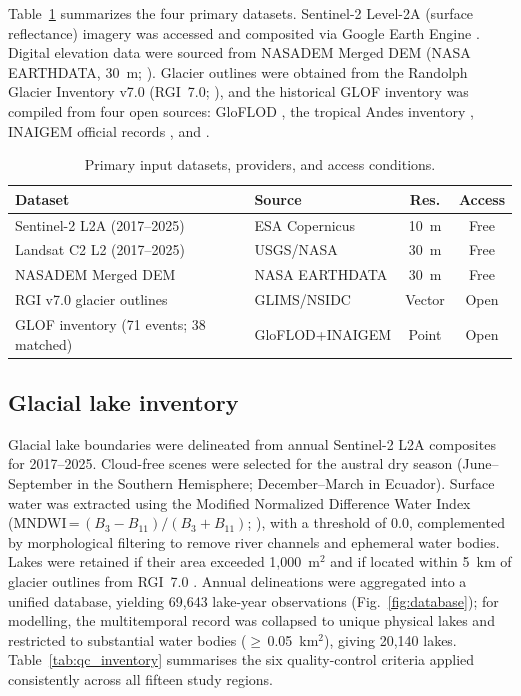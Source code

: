 \documentclass[pdflatex,sn-basic]{sn-jnl}%
\begin{document}
Table~\ref{tab:data_sources} summarizes the four primary datasets.
Sentinel-2 Level-2A (surface reflectance) imagery was accessed and
composited via Google Earth Engine \citep{Gorelick2017}. Digital elevation data were sourced
from NASADEM Merged DEM (NASA EARTHDATA, 30~m; \citep{NASADEM2020}).
Glacier outlines were obtained from the Randolph Glacier Inventory
v7.0 (RGI~7.0; \citep{RGI2023}), and the historical GLOF inventory
was compiled from four open sources: GloFLOD \citep{Lutzow2023}, the
tropical Andes inventory \citep{Emmer2022}, INAIGEM official records
\citep{INAIGEM2018}, and \citet{IribarrenAnacona2015}.

\begin{table}[!t]
\caption{Primary input datasets, providers, and access conditions.}
\label{tab:data_sources}
\centering
\begin{tabular*}{\textwidth}{@{\extracolsep{\fill}}llcc}
\toprule
\textbf{Dataset} & \textbf{Source} & \textbf{Res.} & \textbf{Access} \\
\midrule
Sentinel-2 L2A (2017--2025) & ESA Copernicus  & 10~m   & Free \\
Landsat C2 L2 (2017--2025)   & USGS/NASA       & 30~m   & Free \\
NASADEM Merged DEM           & NASA EARTHDATA  & 30~m   & Free \\
RGI v7.0 glacier outlines    & GLIMS/NSIDC     & Vector & Open \\
GLOF inventory (71 events; 38 matched) & GloFLOD+INAIGEM & Point & Open \\
\bottomrule
\end{tabular*}
\end{table}

\subsection{Glacial lake inventory}

Glacial lake boundaries were delineated from annual Sentinel-2 L2A
composites for 2017--2025. Cloud-free scenes were selected for the
austral dry season (June--September in the Southern Hemisphere;
December--March in Ecuador). Surface water was extracted using the
Modified Normalized Difference Water Index
(MNDWI\,=\,$(B_3-B_{11})/(B_3+B_{11})$; \citep{Xu2006,McFeeters1996}),
with a threshold of 0.0, complemented by morphological filtering to
remove river channels and ephemeral water bodies. Lakes were retained
if their area exceeded 1{,}000~m$^2$ and if located within 5~km of
glacier outlines from RGI~7.0 \citep{RGI2023}. Annual delineations
were aggregated into a unified database, yielding 69{,}643 lake-year
observations (Fig.~\ref{fig:database}); for modelling, the multitemporal
record was collapsed to unique physical lakes and restricted to
substantial water bodies ($\geq$\,0.05~km$^2$), giving 20{,}140 lakes.
Table~\ref{tab:qc_inventory} summarises the six quality-control criteria
applied consistently across all fifteen study regions.
\end{document}

